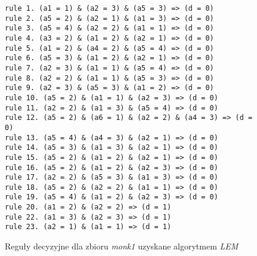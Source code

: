 \begin{figure}
\begin{verbatim}
rule 1. (a1 = 1) & (a2 = 3) & (a5 = 3) => (d = 0)
rule 2. (a5 = 2) & (a2 = 1) & (a1 = 3) => (d = 0)
rule 3. (a5 = 4) & (a2 = 2) & (a1 = 1) => (d = 0)
rule 4. (a3 = 2) & (a1 = 2) & (a2 = 1) => (d = 0)
rule 5. (a1 = 2) & (a4 = 2) & (a5 = 4) => (d = 0)
rule 6. (a5 = 3) & (a1 = 2) & (a2 = 1) => (d = 0)
rule 7. (a2 = 3) & (a1 = 1) & (a5 = 4) => (d = 0)
rule 8. (a2 = 2) & (a1 = 1) & (a5 = 3) => (d = 0)
rule 9. (a2 = 3) & (a5 = 3) & (a1 = 2) => (d = 0)
rule 10. (a5 = 2) & (a1 = 1) & (a2 = 3) => (d = 0)
rule 11. (a2 = 2) & (a1 = 3) & (a5 = 4) => (d = 0)
rule 12. (a5 = 2) & (a6 = 1) & (a2 = 2) & (a4 = 3) => (d = 0)
rule 13. (a5 = 4) & (a4 = 3) & (a2 = 1) => (d = 0)
rule 14. (a5 = 3) & (a1 = 3) & (a2 = 1) => (d = 0)
rule 15. (a5 = 2) & (a1 = 2) & (a2 = 1) => (d = 0)
rule 16. (a5 = 2) & (a1 = 2) & (a2 = 3) => (d = 0)
rule 17. (a2 = 2) & (a5 = 3) & (a1 = 3) => (d = 0)
rule 18. (a5 = 2) & (a2 = 2) & (a1 = 1) => (d = 0)
rule 19. (a5 = 4) & (a1 = 2) & (a2 = 3) => (d = 0)
rule 20. (a1 = 2) & (a2 = 2) => (d = 1)
rule 22. (a1 = 3) & (a2 = 3) => (d = 1)
rule 23. (a2 = 1) & (a1 = 1) => (d = 1)
\end{verbatim}
\caption{Reguły decyzyjne dla zbioru \emph{monk1} uzyskane algorytmem \emph{LEM}}
\label{p2t2-vote-rules}
\end{figure}
